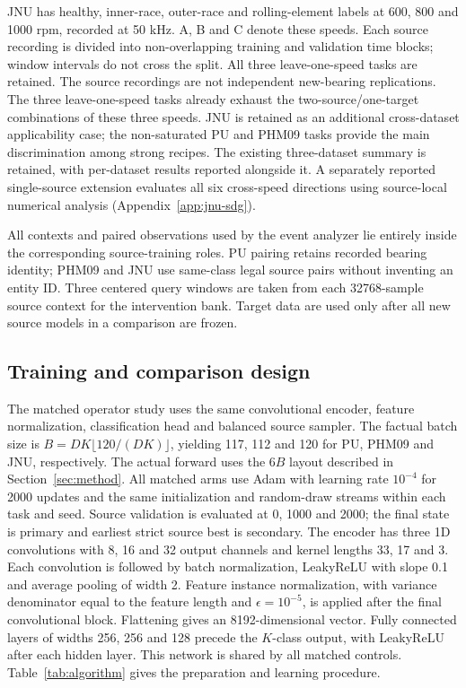 JNU \cite{jnu} has healthy, inner-race, outer-race and rolling-element labels at 600, 800
and 1000 rpm, recorded at 50 kHz. A, B and C denote these speeds. Each source
recording is divided into non-overlapping training and validation time blocks;
window intervals do not cross the split. All three leave-one-speed tasks are
retained. The source recordings are not independent new-bearing replications.
The three leave-one-speed tasks already exhaust the two-source/one-target
combinations of these three speeds. JNU is retained as an additional
cross-dataset applicability case; the non-saturated PU and PHM09 tasks provide
the main discrimination among strong recipes. The existing three-dataset
summary is retained, with per-dataset results reported alongside it.
A separately reported single-source extension evaluates all six cross-speed
directions using source-local numerical analysis (Appendix~\ref{app:jnu-sdg}).

All contexts and paired observations used by the event analyzer lie entirely
inside the corresponding source-training roles. PU pairing retains recorded
bearing identity; PHM09 and JNU use same-class legal source pairs without
inventing an entity ID. Three centered query windows are taken from each
32768-sample source context for the intervention bank. Target data are used
only after all new source models in a comparison are frozen.

\subsection{Training and comparison design}
The matched operator study uses the same convolutional encoder, feature
normalization, classification head and balanced source sampler. The factual
batch size is
$B=DK\lfloor120/(DK)\rfloor$, yielding 117, 112 and 120 for PU, PHM09 and JNU,
respectively. The actual forward uses the $6B$ layout described in
Section~\ref{sec:method}. All matched arms use Adam with learning rate
$10^{-4}$ for 2000 updates and the same initialization and random-draw streams
within each task and seed. Source validation is evaluated at 0, 1000 and 2000;
the final state is primary and earliest strict source best is secondary.
The encoder has three 1D convolutions with 8, 16 and 32 output channels and
kernel lengths 33, 17 and 3. Each convolution is followed by batch
normalization, LeakyReLU with slope 0.1 and average pooling of width 2.
Feature instance normalization, with variance denominator equal to the feature
length and $\epsilon=10^{-5}$, is applied after the final convolutional block.
Flattening gives an 8192-dimensional vector. Fully connected layers of widths
256, 256 and 128 precede the $K$-class output, with LeakyReLU after each hidden
layer. This network is shared by all matched controls.
Table~\ref{tab:algorithm} gives the preparation and learning procedure.

